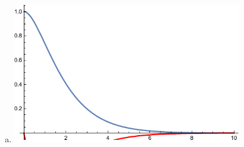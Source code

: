 \documentclass[10pt]{mypackage}
\begin{document}
\begin{enumerate}[(a)]
\begin{center}
    \end{center}
  \item \hfill
    \begin{center}
      \includegraphics[width=10cm]{images/3_5_4e.pdf}
    \end{center}
\end{enumerate}
\end{document}

